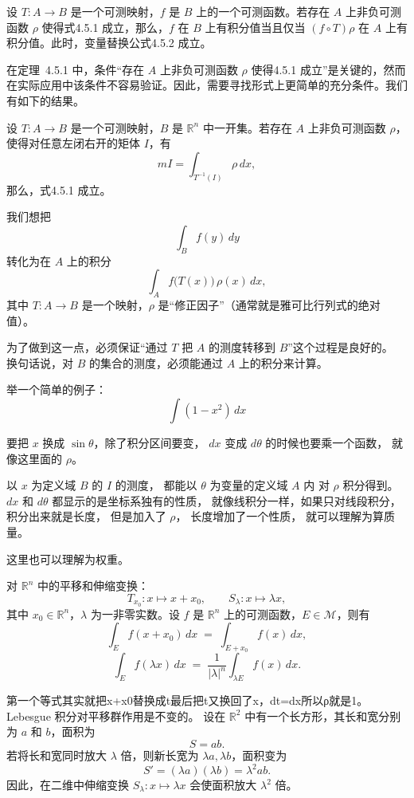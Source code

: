 \documentclass[lang=cn,10pt]{elegantbook}
\begin{document}
\begin{theorem}[积分的变量替换]\label{thm:4.5.1}
设 $T: A \to B$ 是一个可测映射，$f$ 是 $B$ 上的一个可测函数。若存在 $A$ 上非负可测函数 $\rho$ 使得式{4.5.1} 成立，那么，$f$ 在 $B$ 上有积分值当且仅当 $(f \circ T)\rho$ 在 $A$ 上有积分值。此时，变量替换公式{4.5.2} 成立。
\end{theorem}
在定理~4.5.1 中，条件“存在 $A$ 上非负可测函数 $\rho$ 使得{4.5.1} 成立”是关键的，然而在实际应用中该条件不容易验证。因此，需要寻找形式上更简单的充分条件。我们有如下的结果。

\begin{theorem}\label{thm:4.5.2}
设 $T: A \to B$ 是一个可测映射，$B$ 是 $\mathbb{R}^n$ 中一开集。若存在 $A$ 上非负可测函数 $\rho$，使得对任意左闭右开的矩体 $I$，有
\[
mI = \int_{T^{-1}(I)} \rho\, dx,
\tag{4.5.3}
\]
那么，式{4.5.1} 成立。
\end{theorem}
我们想把
\[
\int_B f(y)\,dy
\]
转化为在 $A$ 上的积分
\[
\int_A f\bigl(T(x)\bigr)\,\rho(x)\,dx ,
\]
其中 $T: A \to B$ 是一个映射，$\rho$ 是“修正因子”（通常就是雅可比行列式的绝对值）。

为了做到这一点，必须保证“通过 $T$ 把 $A$ 的测度转移到 $B$”这个过程是良好的。
换句话说，对 $B$ 的集合的测度，必须能通过 $A$ 上的积分来计算。

举一个简单的例子：
\[
\int (1 - x^2)\, dx
\]

要把 $x$ 换成 $\sin\theta$，除了积分区间要变，
$dx$ 变成 $d\theta$ 的时候也要乘一个函数，
就像这里面的 $\rho$。

以 $x$ 为定义域 $B$ 的 $I$ 的测度，
都能以 $\theta$ 为变量的定义域 $A$ 内
对 $\rho$ 积分得到。
$dx$ 和 $d\theta$ 都显示的是坐标系独有的性质，
就像线积分一样，如果只对线段积分，
积分出来就是长度，
但是加入了 $\rho$，
长度增加了一个性质，
就可以理解为算质量。

这里也可以理解为权重。
\begin{corollary}\label{cor:4.5.1}
对 $\mathbb{R}^n$ 中的平移和伸缩变换：
\[
T_{x_0}: x \mapsto x + x_0, 
\qquad
S_{\lambda}: x \mapsto \lambda x,
\]
其中 $x_0 \in \mathbb{R}^n$，$\lambda$ 为一非零实数。设 $f$ 是 $\mathbb{R}^n$ 上的可测函数，$E \in \mathcal{M}$，则有
\[
\int_E f(x+x_0)\,dx \;=\; \int_{E+x_0} f(x)\,dx,
\]
\[
\int_E f(\lambda x)\,dx \;=\; \frac{1}{|\lambda|^n} \int_{\lambda E} f(x)\,dx.
\]
\end{corollary}
第一个等式其实就把x+x0替换成t最后把t又换回了x，dt=dx所以ρ就是1。
Lebesgue 积分对平移群作用是不变的。
设在 $\mathbb{R}^2$ 中有一个长方形，其长和宽分别为 $a$ 和 $b$，面积为
\[
S = ab.
\]
若将长和宽同时放大 $\lambda$ 倍，则新长宽为 $\lambda a, \lambda b$，面积变为
\[
S' = (\lambda a)(\lambda b) = \lambda^2 ab.
\]
因此，在二维中伸缩变换 $S_\lambda: x \mapsto \lambda x$ 会使面积放大 $\lambda^2$ 倍。
\end{document}
